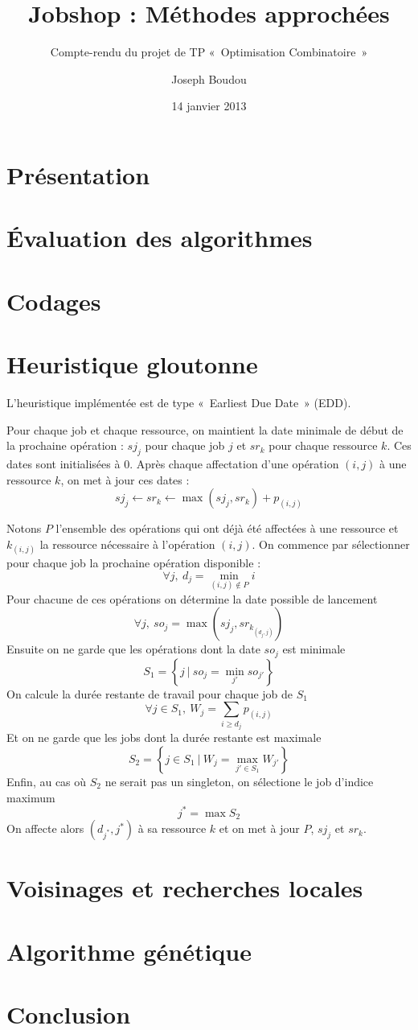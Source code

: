\documentclass{rapport}
\begin{document}
\title{Jobshop : Méthodes approchées}
\subtitle{Compte-rendu du projet de TP «~Optimisation Combinatoire~»}
\author{Joseph Boudou}
\date{14 janvier 2013}
\maketitle

\section{Présentation}

\section{Évaluation des algorithmes}

\section{Codages}

\section{Heuristique gloutonne}

L'heuristique implémentée est de type «~Earliest Due Date~» (EDD).

Pour chaque job et chaque ressource, on maintient la date minimale de début de la prochaine
opération : $sj_j$ pour chaque job $j$ et $sr_k$ pour chaque ressource $k$. Ces dates sont
initialisées à $0$. Après chaque affectation d'une opération $(i,j)$ à une ressource $k$, on met à
jour ces dates :
$$ sj_j \leftarrow sr_k \leftarrow \max (sj_j, sr_k) + p_{(i,j)} $$

Notons $P$ l'ensemble des opérations qui ont déjà été affectées à une ressource et $k_{(i,j)}$
la ressource nécessaire à l'opération $(i,j)$. On commence par sélectionner pour chaque job la
prochaine opération disponible :
$$ \forall j,~d_j = \min_{(i,j) \notin P} i $$
Pour chacune de ces opérations on détermine la date possible de lancement
$$ \forall j,~so_j = \max (sj_j, sr_{k_{(d_j,j)}}) $$
Ensuite on ne garde que les opérations dont la date $so_j$ est minimale
$$ S_1 = \left\{ j ~|~ so_j = \min_{j'} {so_{j'}} \right\} $$
On calcule la durée restante de travail pour chaque job de $S_1$
$$ \forall j \in S_1,~ W_j = \sum_{i \geq d_j}{p_{(i,j)}} $$
Et on ne garde que les jobs dont la durée restante est maximale
$$ S_2 = \left\{ j \in S_1 ~|~ W_j = \max_{j' \in S_1}{W_{j'}} \right\} $$
Enfin, au cas où $S_2$ ne serait pas un singleton, on sélectione le job d'indice maximum
$$ j^* = \max S_2 $$
On affecte alors $(d_{j^*}, j^*)$ à sa ressource $k$ et on met à jour $P$, $sj_{j}$ et $sr_k$.



\section{Voisinages et recherches locales}

\section{Algorithme génétique}

\section{Conclusion}
\end{document}
